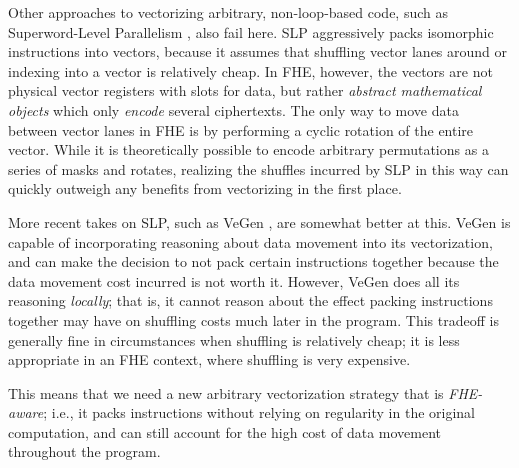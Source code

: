 
Other approaches to vectorizing arbitrary, non-loop-based code, such as Superword-Level Parallelism \cite{SLP}, also fail here.
SLP aggressively packs isomorphic instructions into vectors, because it assumes that shuffling vector lanes around or indexing into a vector is relatively cheap.
In FHE, however, the vectors are not physical vector registers with slots for data, but rather {\em abstract mathematical objects} which only {\em encode} several ciphertexts.
The only way to move data between vector lanes in FHE is by performing a cyclic rotation of the entire vector.
While it is theoretically possible to encode arbitrary permutations as a series of masks and rotates, realizing the shuffles incurred by SLP in this way can quickly outweigh any benefits from vectorizing in the first place.

More recent takes on SLP, such as VeGen \cite{VeGen}, are somewhat better at this.
VeGen is capable of incorporating reasoning about data movement into its vectorization, and can make the decision to not pack certain instructions together because the data movement cost incurred is not worth it.
However, VeGen does all its reasoning {\em locally}; that is, it cannot reason about the effect packing instructions together may have on shuffling costs much later in the program. This tradeoff is generally fine in circumstances when shuffling is relatively cheap; it is less appropriate in an FHE context, where shuffling is very expensive.

This means that we need a new arbitrary vectorization strategy that is {\em FHE-aware}; i.e., it packs instructions without relying on regularity in the original computation, and can still account for the high cost of data movement throughout the program.

